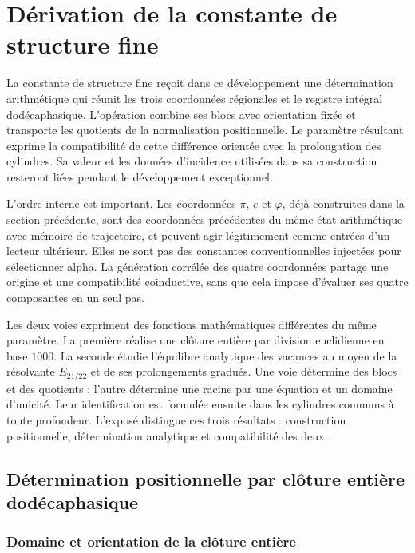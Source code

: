 \section{Dérivation de la constante de structure fine}
\label{sec:alpha}

La constante de structure fine reçoit dans ce développement une détermination arithmétique qui réunit les trois coordonnées régionales et le registre intégral dodécaphasique. L'opération combine ses blocs avec orientation fixée et transporte les quotients de la normalisation positionnelle. Le paramètre résultant exprime la compatibilité de cette différence orientée avec la prolongation des cylindres. Sa valeur et les données d'incidence utilisées dans sa construction resteront liées pendant le développement exceptionnel.

L'ordre interne est important. Les coordonnées \(\pi\), \(e\) et \(\varphi\), déjà construites dans la section précédente, sont des coordonnées
précédentes du même état arithmétique avec mémoire de trajectoire, et peuvent agir légitimement comme
entrées d'un lecteur ultérieur. Elles ne sont pas des constantes conventionnelles
injectées pour sélectionner alpha. La génération corrélée des quatre coordonnées partage une origine et
une compatibilité coinductive, sans que cela impose d'évaluer ses quatre
composantes en un seul pas.

Les deux voies expriment des fonctions mathématiques différentes du même paramètre.
La première réalise une clôture entière par division euclidienne en base
\(1000\). La seconde étudie l’équilibre analytique des vacances au moyen
de la résolvante \(E_{21/22}\) et de ses prolongements gradués. Une voie
détermine des blocs et des quotients ; l’autre détermine une racine par une
équation et un domaine d’unicité. Leur identification est formulée ensuite
dans les cylindres communs à toute profondeur. L’exposé distingue
ces trois résultats : construction positionnelle, détermination analytique
et compatibilité des deux.

\subsection{Détermination positionnelle par clôture entière dodécaphasique}
\subsubsection{Domaine et orientation de la clôture entière}
\label{subsec:alpha-dominio}

